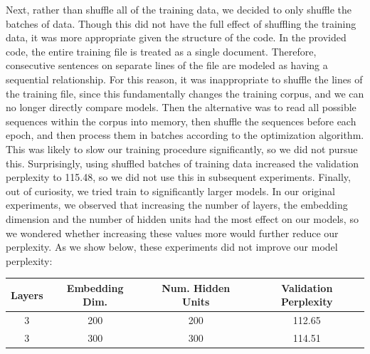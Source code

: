 \documentclass[a4paper]{article}
\begin{document}
Next, rather than shuffle all of the training data, we decided to only shuffle the batches of data. Though this did not have the full effect of shuffling the training data, it was more appropriate given the structure of the code. In the provided code, the entire training file is treated as a single document. Therefore, consecutive sentences on separate lines of the file are modeled as having a sequential relationship. For this reason, it was inappropriate to shuffle the lines of the training file, since this fundamentally changes the training corpus, and we can no longer directly compare models. Then the alternative was to read all possible sequences within the corpus into memory, then shuffle the sequences before each epoch, and then process them in batches according to the optimization algorithm. This was likely to slow our training procedure significantly, so we did not pursue this. Surprisingly, using shuffled batches of training data increased the validation perplexity to 115.48, so we did not use this in subsequent experiments.
\newline
\newline
Finally, out of curiosity, we tried train to significantly larger models. In our original experiments, we observed that increasing the number of layers, the embedding dimension and the number of hidden units had the most effect on our models, so we wondered whether increasing these values more would further reduce our perplexity. As we show below, these experiments did not improve our model perplexity:
\begin{center}
\begin{tabular}{|c | c | c | c |} 
\hline
Layers & Embedding Dim. & Num. Hidden Units & Validation Perplexity \\ \hline \hline
3 & 200 & 200 & 112.65\\ \hline
3 & 300 & 300 &  114.51\\ \hline
\end{tabular}
\end{center}
\end{document}
